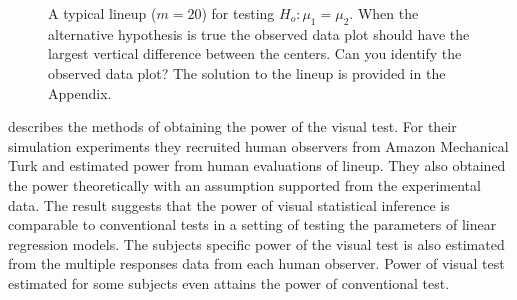 \begin{figure}[hbtp]
   \centering
      \caption{A typical lineup  ($m = 20$) for testing $H_o: \mu_1 =  \mu_2$. 
      When the alternative hypothesis is true the observed data plot should have the largest vertical difference between the centers. Can you identify the observed data plot? The solution to the lineup is provided in the Appendix.}
      \label{lineup}
\end{figure}



\cite{majumder:2011} describes the methods of obtaining the power of the visual test. For their simulation experiments they recruited human observers from Amazon Mechanical Turk \citep{turk} and estimated power from human evaluations of lineup. They also obtained the power theoretically with an assumption supported from the experimental data. The result suggests that the power of visual statistical inference is comparable to conventional tests in a setting of testing the parameters of linear regression models. The subjects specific power of the visual test is also estimated from the multiple responses data from each human observer. Power of visual test estimated for some subjects even attains the power of conventional test.  

